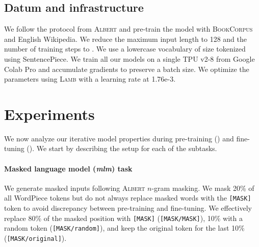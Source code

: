 \subsection{Datum and infrastructure}

We follow the protocol from \textsc{Albert} and pre-train the model with \textsc{BookCorpus}~\parencite{zhu_15} and English Wikipedia. We reduce the maximum input length to 128 and the number of training steps to . We use a lowercase vocabulary of size  tokenized using SentencePiece. We train all our models on a single TPU v2-8 from Google Colab Pro and accumulate gradients to preserve a  batch size. We optimize the parameters using \textsc{Lamb} with a learning rate at 1.76e-3.

\section{Experiments}

We now analyze our iterative model properties during pre-training () and fine-tuning (). We start by describing the setup for each of the subtasks.


\paragraph{Masked language model (\textit{mlm}) task} We generate masked inputs following \textsc{Albert} $n$-gram masking. We mask 20\% of all WordPiece tokens but do not always replace masked words with the \texttt{[MASK]} token to avoid discrepancy between pre-training and fine-tuning. We effectively replace 80\% of the masked position with \texttt{[MASK]} (\texttt{[MASK/MASK]}), 10\% with a random token (\texttt{[MASK/random]}), and keep the original token for the last 10\% (\texttt{[MASK/original]}).

